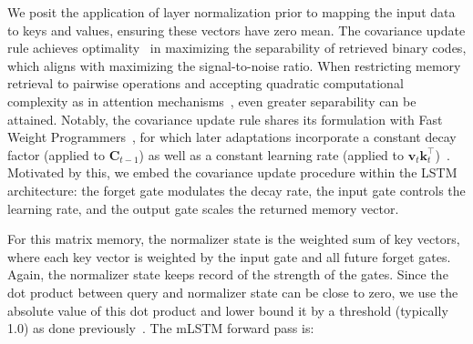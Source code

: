 We posit the application of layer normalization prior to mapping the input data to keys and values, ensuring these vectors have zero mean. The covariance update rule achieves optimality~\citep{Dayan:91} in maximizing the separability of retrieved binary codes, which aligns with maximizing the signal-to-noise ratio. When restricting memory retrieval to pairwise operations and accepting quadratic computational complexity as in attention mechanisms~\citep{Krotov:16,Krotov:17,Ramsauer:21}, even greater separability can be attained. Notably, the covariance update rule shares its formulation with Fast Weight Programmers~\citep{Schmidhuber:92ncfastweights,Schlag:21}, for which later adaptations incorporate a constant decay factor (applied to $\mathbf{C}_{t-1}$) as well as a constant learning rate (applied to 
$\mathbf{v}_{t} \mathbf{k}_t ^\top$)~\citep{Ba:16}. Motivated by this, we embed the covariance update procedure within the LSTM architecture: the forget gate modulates the decay rate, the input gate controls the learning rate, and the output gate scales the returned memory vector.

For this matrix memory, the normalizer state is the weighted sum of key vectors, where each key vector is weighted by the input gate and all future forget gates. Again, the normalizer state keeps record of the strength of the gates. Since the dot product between query and normalizer state can be close to zero, we use the absolute value of this dot product and lower bound it by a threshold (typically 1.0) as done previously~\citep{Sun:23arxiv}. The mLSTM forward pass is:

